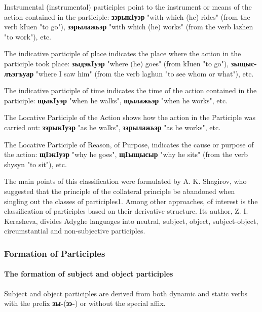 \documentclass[a4paper,12pt]{book}
\newcommand{\1}[1]{\textbf{\emph{#1}}} %
\newcommand{\2}[1]{\textbf{[#1]}} %
\newcommand{\3}[1]{\fontsize{11pt}{0cm}\textbf{\emph{#1}}} %
\newcommand{\4}[1]{\fontsize{10pt}{0cm}\emph{#1}}	%
\newcommand{\5}[1]{\textbf{/#1/}} %
\newcommand{\6}[1]{\textbf{[#1]}} %
\newcommand{\7}[1]{\fontsize{12pt}{0cm}\emph{#1}} %
\newcommand{\8}[1]{\fontsize{12pt}{0cm}`#1'} %
\newcommand{\9}[1]{\fontsize{12pt}{0cm}(lit. `#1')} %
\begin{document}
Instrumental (instrumental) participles point to the instrument or means of the action contained in the participle: \textbf{зэрыкIуэр} "with which (he) rides" (from the verb kIuen "to go"), \textbf{зэрылажьэр} "with which (he) works" (from the verb lazhen "to work"), etc.

The indicative participle of place indicates the place where the action in the participle took place: \textbf{зыдэкIуэр} "where (he) goes" (from kIuen "to go"), \textbf{зыщыс-лъэгъуар} "where I saw him" (from the verb laghun "to see whom or what"), etc.

The indicative participle of time indicates the time of the action contained in the participle: \textbf{щыкIуэр} "when he walks", \textbf{щылажьэр} "when he works", etc.

The Locative Participle of the Action shows how the action in the Participle was carried out: \textbf{зэрыкIуэр} "as he walks", \textbf{зэрылажьэр} "as he works", etc.

The Locative Participle of Reason, of Purpose, indicates the cause or purpose of the action: \textbf{щIэкIуэр} "why he goes", \textbf{щIыщысыр} "why he sits" (from the verb shysyn "to sit"), etc.

The main points of this classification were formulated by A. K. Shagirov, who suggested that the principle of the collateral principle be abandoned when singling out the classes of participles1. Among other approaches, of interest is the classification of participles based on their derivative structure. Its author, Z. I. Kerasheva, divides Adyghe languages into neutral, subject, object, subject-object, circumstantial and non-subjective participles.


\subsubsection{Formation of Participles}
\paragraph{The formation of subject and object participles}

Subject and object participles are derived from both dynamic and static verbs with the prefix \textbf{зы-}(\textbf{зэ-}) or without the special affix.
\end{document}
